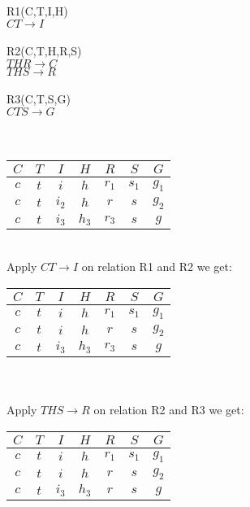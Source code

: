 
R1(C,T,I,H)\\
$CT \rightarrow I$\\ \\

R2(C,T,H,R,S)\\
$THR \rightarrow C$\\
$THS \rightarrow R$\\ \\

R3(C,T,S,G)\\
$CTS \rightarrow G$ \\ \\ \\ 

\begin{tabular}{ c | c | c | c | c | c | c }
  $C$ & $T$ & $I$ & $H$ & $R$ & $S$ & $G$ \\ 
  \hline\hline
  $c$ & $t$ & $i$ & $h$ & $r_1$ & $s_1$ & $g_1$\\
  \hline 
  $c$ & $t$ & $i_2$ & $h$ & $r$ & $s$ & $g_2$\\
  \hline 
  $c$ & $t$ & $i_3$ & $h_3$ & $r_3$ & $s$ & $g$\\
\end{tabular} \\

Apply $CT \rightarrow I$ on relation R1 and R2 we get:\\

\begin{tabular}{ c | c | c | c | c | c | c }
  $C$ & $T$ & $I$ & $H$ & $R$ & $S$ & $G$ \\ 
  \hline\hline
  $c$ & $t$ & $i$ & $h$ & $r_1$ & $s_1$ & $g_1$\\
  \hline 
  $c$ & $t$ & $i$ & $h$ & $r$ & $s$ & $g_2$\\
  \hline 
  $c$ & $t$ & $i_3$ & $h_3$ & $r_3$ & $s$ & $g$\\
\end{tabular} \\ \\
Apply $THS \rightarrow R$ on relation R2 and R3 we get:\\

\begin{tabular}{ c | c | c | c | c | c | c }
  $C$ & $T$ & $I$ & $H$ & $R$ & $S$ & $G$ \\ 
  \hline\hline
  $c$ & $t$ & $i$ & $h$ & $r_1$ & $s_1$ & $g_1$\\
  \hline 
  $c$ & $t$ & $i$ & $h$ & $r$ & $s$ & $g_2$\\
  \hline 
  $c$ & $t$ & $i_3$ & $h_3$ & $r$ & $s$ & $g$\\
\end{tabular} \\

